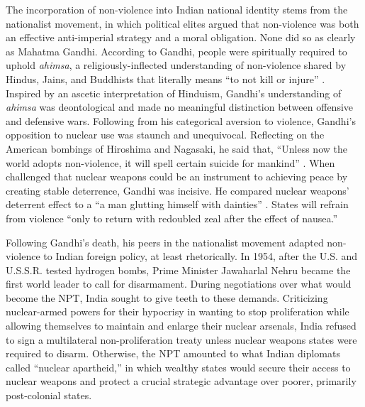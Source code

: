 \documentclass[12pt]{article}
\begin{document}
The incorporation of non-violence into Indian national identity stems from the nationalist movement, in which political elites argued that non-violence was both an effective anti-imperial strategy and a moral obligation. None did so as clearly as Mahatma Gandhi. According to Gandhi, people were spiritually required to uphold \textit{ahimsa}, a religiously-inflected understanding of non-violence shared by Hindus, Jains, and Buddhists that literally means “to not kill or injure” \citep{young_hinduism_2004}. Inspired by an ascetic interpretation of Hinduism, Gandhi's understanding of \textit{ahimsa} was deontological and made no meaningful distinction between offensive and defensive wars. Following from his categorical aversion to violence, Gandhi's opposition to nuclear use was staunch and unequivocal. Reflecting on the American bombings of Hiroshima and Nagasaki, he said that, “Unless now the world adopts non-violence, it will spell certain suicide for mankind” \citep[12]{mitra_moral_1987}. When challenged that nuclear weapons could be an instrument to achieving peace by creating stable deterrence, Gandhi was incisive. He compared nuclear weapons' deterrent effect to a “a man glutting himself with dainties” \citep[278]{gandhi_my_2025}. States will refrain from violence “only to return with redoubled zeal after the effect of nausea.”

Following Gandhi's death, his peers in the nationalist movement adapted non-violence to Indian foreign policy, at least rhetorically. In 1954, after the U.S. and U.S.S.R. tested hydrogen bombs, Prime Minister Jawaharlal Nehru became the first world leader to call for disarmament. During negotiations over what would become the NPT, India sought to give teeth to these demands. Criticizing nuclear-armed powers for their hypocrisy in wanting to stop proliferation while allowing themselves to maintain and enlarge their nuclear arsenals, India refused to sign a multilateral non-proliferation treaty unless nuclear weapons states were required to disarm. Otherwise, the NPT amounted to what Indian diplomats called “nuclear apartheid,” in which wealthy states would secure their access to nuclear weapons and protect a crucial strategic advantage over poorer, primarily post-colonial states.
\end{document}
